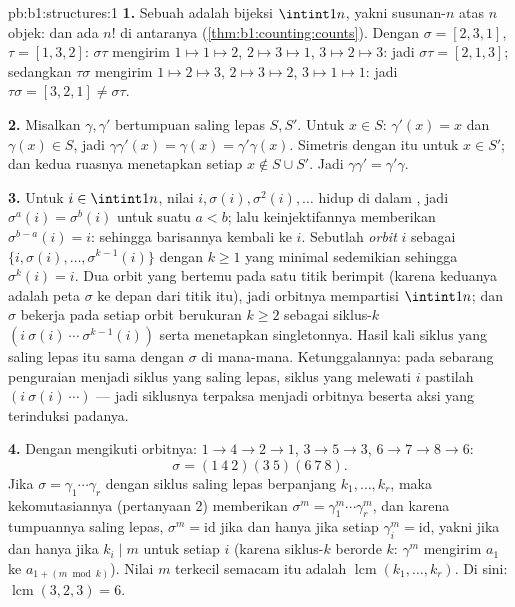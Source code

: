 \begin{solution}{pb:b1:structures:1}
\textbf{1.} Sebuah  adalah bijeksi $\intint1n$, yakni
susunan-$n$ atas $n$ objek: dan ada $n!$ di antaranya
(\cref{thm:b1:counting:counts}). Dengan $\sigma = [2,3,1]$, $\tau =
[1,3,2]$: $\sigma\tau$ mengirim $1 \mapsto 1 \mapsto 2$, $2 \mapsto 3
\mapsto 1$, $3 \mapsto 2 \mapsto 3$: jadi $\sigma\tau = [2,1,3]$; sedangkan
$\tau\sigma$ mengirim $1 \mapsto 2 \mapsto 3$, $2 \mapsto 3 \mapsto
2$, $3 \mapsto 1 \mapsto 1$: jadi $\tau\sigma = [3,2,1] \neq
\sigma\tau$.

\textbf{2.} Misalkan $\gamma, \gamma'$ bertumpuan saling lepas $S, S'$.
Untuk $x \in S$: $\gamma'(x) = x$ dan $\gamma(x) \in S$, jadi
$\gamma\gamma'(x) = \gamma(x) = \gamma'\gamma(x)$. Simetris dengan itu
untuk $x \in S'$; dan kedua ruasnya menetapkan setiap $x \notin S \cup S'$. Jadi
$\gamma\gamma' = \gamma'\gamma$.

\textbf{3.} Untuk $i \in \intint1n$, nilai $i, \sigma(i),
\sigma^2(i), \dots$ hidup di dalam , jadi $\sigma^a(i) =
\sigma^b(i)$ untuk suatu $a < b$; lalu keinjektifannya memberikan $\sigma^{b-a}(i)
= i$: sehingga barisannya kembali ke $i$. Sebutlah \emph{orbit} $i$ sebagai
 $\{i, \sigma(i), \dots, \sigma^{k-1}(i)\}$ dengan $k \geq 1$
yang minimal sedemikian sehingga $\sigma^k(i) = i$. Dua orbit yang bertemu pada satu
titik berimpit (karena keduanya adalah peta $\sigma$ ke depan dari titik
itu), jadi orbitnya mempartisi $\intint1n$; dan $\sigma$ bekerja pada setiap
orbit berukuran $k \geq 2$ sebagai siklus-$k$ $(i\ \sigma(i)\ \cdots\
\sigma^{k-1}(i))$ serta menetapkan singletonnya. Hasil kali siklus
yang saling lepas itu sama dengan $\sigma$ di mana-mana. Ketunggalannya: pada
sebarang penguraian menjadi siklus yang saling lepas, siklus yang melewati $i$ pastilah
$(i\ \sigma(i)\ \cdots)$ --- jadi siklusnya terpaksa menjadi
orbitnya beserta aksi yang terinduksi padanya.

\textbf{4.} Dengan mengikuti orbitnya: $1 \to 4 \to 2 \to 1$, $3 \to 5
\to 3$, $6 \to 7 \to 8 \to 6$:
\[
\sigma = (1\ 4\ 2)(3\ 5)(6\ 7\ 8) .
\]
Jika $\sigma = \gamma_1\cdots\gamma_r$ dengan siklus saling lepas berpanjang
$k_1, \dots, k_r$, maka kekomutasiannya (pertanyaan 2) memberikan
$\sigma^m = \gamma_1^m\cdots\gamma_r^m$, dan karena tumpuannya
saling lepas, $\sigma^m = \mathrm{id}$ jika dan hanya jika setiap $\gamma_i^m =
\mathrm{id}$, yakni jika dan hanya jika $k_i \mid m$ untuk setiap $i$ (karena siklus-$k$ berorde
$k$: $\gamma^m$ mengirim $a_1$ ke $a_{1 + (m \bmod k)}$). Nilai $m$
terkecil semacam itu adalah $\operatorname{lcm}(k_1, \dots, k_r)$. Di sini:
$\operatorname{lcm}(3, 2, 3) = 6$.


\end{solution}
